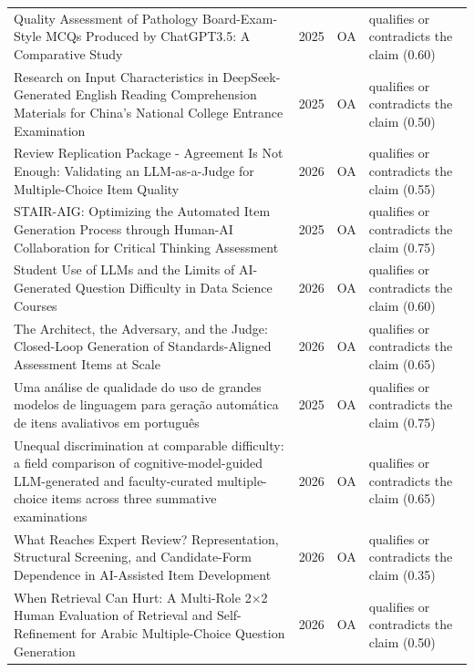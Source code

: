 \begin{longtable}{@{}%
  >{\raggedright\arraybackslash}p{}c%
  >{\raggedright\arraybackslash}p{}%
  >{\raggedright\arraybackslash}p{}@{}}
Quality Assessment of Pathology Board-Exam-Style MCQs Produced by ChatGPT3.5: A Comparative Study & 2025 & OA & qualifies or contradicts the claim (0.60) \\
Research on Input Characteristics in DeepSeek-Generated English Reading Comprehension Materials for China's National College Entrance Examination & 2025 & OA & qualifies or contradicts the claim (0.50) \\
Review Replication Package - Agreement Is Not Enough: Validating an LLM-as-a-Judge for Multiple-Choice Item Quality & 2026 & OA & qualifies or contradicts the claim (0.55) \\
STAIR-AIG: Optimizing the Automated Item Generation Process through Human-AI Collaboration for Critical Thinking Assessment & 2025 & OA & qualifies or contradicts the claim (0.75) \\
Student Use of LLMs and the Limits of AI-Generated Question Difficulty in Data Science Courses & 2026 & OA & qualifies or contradicts the claim (0.60) \\
The Architect, the Adversary, and the Judge: Closed-Loop Generation of Standards-Aligned Assessment Items at Scale & 2026 & OA & qualifies or contradicts the claim (0.65) \\
Uma análise de qualidade do uso de grandes modelos de linguagem para geração automática de itens avaliativos em português & 2025 & OA & qualifies or contradicts the claim (0.75) \\
Unequal discrimination at comparable difficulty: a field comparison of cognitive-model-guided LLM-generated and faculty-curated multiple-choice items across three summative examinations & 2026 & OA & qualifies or contradicts the claim (0.65) \\
What Reaches Expert Review? Representation, Structural Screening, and Candidate-Form Dependence in AI-Assisted Item Development & 2026 & OA & qualifies or contradicts the claim (0.35) \\
When Retrieval Can Hurt: A Multi-Role 2×2 Human Evaluation of Retrieval and Self-Refinement for Arabic Multiple-Choice Question Generation & 2026 & OA & qualifies or contradicts the claim (0.50) \\
\end{longtable}
\endgroup
